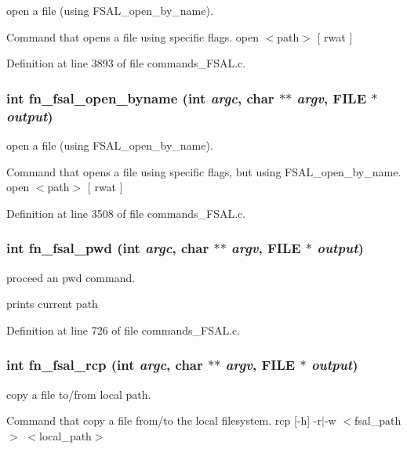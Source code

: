 open a file (using FSAL\_\-open\_\-by\_\-name).

Command that opens a file using specific flags. open $<$path$>$ [ rwat ] 

Definition at line 3893 of file commands\_\-FSAL.c.
\subsubsection[{fn\_\-fsal\_\-open\_\-byname}]{\setlength{\rightskip}{0pt plus 5cm}int fn\_\-fsal\_\-open\_\-byname (int {\em argc}, \/  char $\ast$$\ast$ {\em argv}, \/  FILE $\ast$ {\em output})}\label{commands_8h_a74f1d4efec11e55723d0ac4eaf7856e}


open a file (using FSAL\_\-open\_\-by\_\-name).

Command that opens a file using specific flags, but using FSAL\_\-open\_\-by\_\-name. open $<$path$>$ [ rwat ] 

Definition at line 3508 of file commands\_\-FSAL.c.
\subsubsection[{fn\_\-fsal\_\-pwd}]{\setlength{\rightskip}{0pt plus 5cm}int fn\_\-fsal\_\-pwd (int {\em argc}, \/  char $\ast$$\ast$ {\em argv}, \/  FILE $\ast$ {\em output})}\label{commands_8h_5889873765cfb1062f3fab4ffd7a38cb}


proceed an pwd command.

prints current path 

Definition at line 726 of file commands\_\-FSAL.c.
\subsubsection[{fn\_\-fsal\_\-rcp}]{\setlength{\rightskip}{0pt plus 5cm}int fn\_\-fsal\_\-rcp (int {\em argc}, \/  char $\ast$$\ast$ {\em argv}, \/  FILE $\ast$ {\em output})}\label{commands_8h_187b923de1fe342ff5e352bbb41acbbe}


copy a file to/from local path.

Command that copy a file from/to the local filesystem. rcp [-h] -r$|$-w $<$fsal\_\-path$>$ $<$local\_\-path$>$ 

